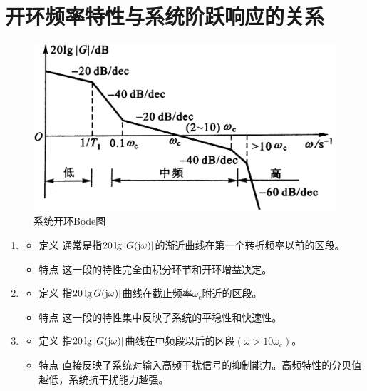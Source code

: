 \section{开环频率特性与系统阶跃响应的关系}
\vspace*{-1em}
\begin{figure}[!htb]
	\centering
	\includegraphics[width=0.53\linewidth]{pic/三频段.jpeg}
	\vspace*{-1em}
	\caption{系统开环Bode图}
	\label{开环Bode图}
\end{figure}
\begin{enumerate}[1. ]
	\item {}
	\begin{itemize}
		\item 定义 \quad 通常是指$20\lg |G(\text{j}\omega)|$的渐近曲线在第一个转折频率以前的区段。
		\item 特点 \quad 这一段的特性完全由积分环节和开环增益决定。
	\end{itemize}
	
	\item {}
	\begin{itemize}
		\item 定义 \quad 指$20\lg G(\text{j}\omega)|$曲线在截止频率$\omega_{\text{c}}$附近的区段。
		\item 特点 \quad 这一段的特性集中反映了系统的平稳性和快速性。
	\end{itemize}
	
	\item {}
	\begin{itemize}
		\item 定义 \quad 指$20\lg |G(\text{j}\omega)|$曲线在中频段以后的区段$(\omega > 10\omega_{\text{c}})$。
		\item 特点 \quad 直接反映了系统对输入高频干扰信号的抑制能力。高频特性的分贝值越低，系统抗干扰能力越强。
	\end{itemize}
\end{enumerate}























 